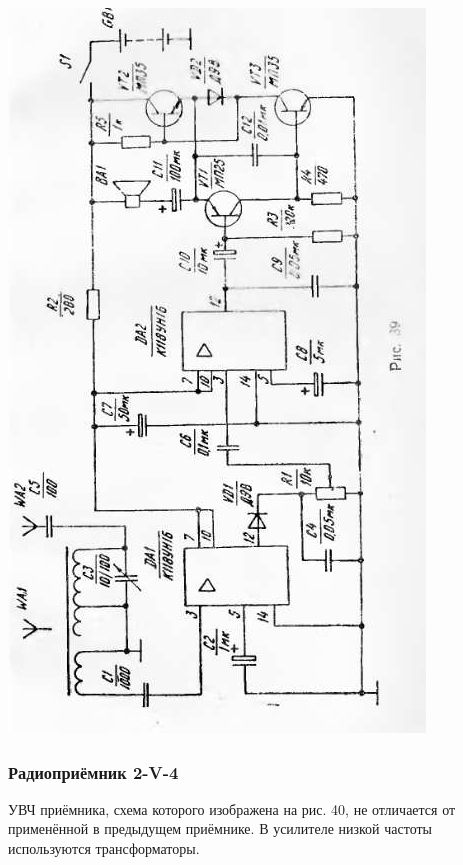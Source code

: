 \documentclass[12pt]{article}
\begin{document}
\newpage
\hspace*{0.7cm}\includegraphics[scale=0.99, angle=-1]{ekon3_037_1}

\newpage

\subsubsection{Радиоприёмник 2-V-4}
УВЧ приёмника, схема которого изображена на рис. 40, не отличается от применённой в предыдущем приёмнике. В усилителе низкой частоты используются трансформаторы.

\hrulefill
\end{document}

